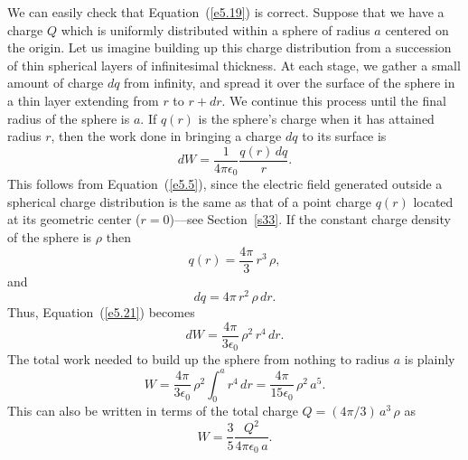 We can easily check that Equation~(\ref{e5.19}) is correct. Suppose that we have a
 charge $Q$ which is uniformly distributed within a sphere of
radius $a$ centered on the origin. Let us imagine building  up this charge distribution 
from  a succession of thin spherical layers of infinitesimal thickness. At each
stage, we gather a small amount of charge $dq$ from infinity, and spread it 
over  the surface of the sphere in a thin
layer extending from $r$ to $r+dr$. We continue this process until the final radius of the
sphere is $a$.  If $q(r)$ is the sphere's charge when it has attained radius
$r$, then the work done in bringing a charge $dq$ to its surface is
\begin{equation}\label{e5.21}
dW = \frac{1}{4\pi\epsilon_0} \frac{ q(r)\,dq}{r}.
\end{equation}
This follows from Equation~(\ref{e5.5}), since the electric field generated outside a spherical charge
distribution 
is the same as that of a point charge $q(r)$ located at its geometric center
($r=0$)---see Section~\ref{s33}. If the constant charge density of the sphere is
$\rho$ then 
\begin{equation}
q(r) = \frac{4\pi}{3} \,r^3\,\rho,
\end{equation}
and
\begin{equation}
dq = 4\pi\, r^2\, \rho\,dr.
\end{equation}
Thus, Equation~(\ref{e5.21}) becomes
\begin{equation}
dW = \frac{4\pi}{3\epsilon_0}\, \rho^2\, r^4\,dr.
\end{equation}
The total work needed to build up the sphere from nothing to radius $a$ is
plainly
\begin{equation}
W = \frac{4\pi}{3\epsilon_0}\, \rho^2 \int_0^a  r^4\,dr = 
\frac{4\pi}{15\epsilon_0}\, \rho^2\,  a^5.
\end{equation}
This can also be written in terms of the total charge
$Q = (4\pi/3)\,a^3\, \rho$ as
\begin{equation}\label{e5.26}
W = \frac{3}{5} \frac{Q^2}{4\pi\epsilon_0\, a}.
\end{equation}

